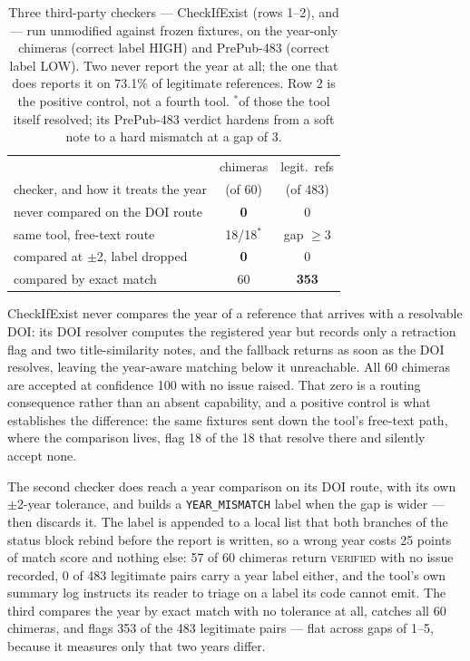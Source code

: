 \documentclass[letterpaper]{article} %
\begin{document}
\begin{table}[t]
\centering
\small
\begin{tabular}{@{}lcc@{}}
\toprule
 & chimeras & legit.\ refs \\
checker, and how it treats the year & (of 60) & (of 483) \\
\midrule
never compared on the DOI route   & \textbf{0}    & 0 \\
\quad same tool, free-text route  & 18/18$^{*}$   & gap $\geq$3 \\
compared at $\pm$2, label dropped & \textbf{0}    & 0 \\
compared by exact match           & 60            & \textbf{353} \\
\bottomrule
\end{tabular}
\caption{Three third-party checkers --- CheckIfExist
\cite{abbonato2026checkifexist} (rows 1--2),
\citet{balakrishnan2025bibverify} and \citet{sachin2026doivalidator} --- run
unmodified against frozen fixtures, on the year-only chimeras (correct label
HIGH) and PrePub-483 (correct label LOW). Two never report the year at all;
the one that does reports it on 73.1\% of legitimate references.
Row 2 is the positive control, not a fourth tool. $^{*}$of those the tool
itself resolved; its PrePub-483 verdict hardens from a soft note to a hard
mismatch at a gap of 3.}
\label{tab:checkers}
\end{table}

CheckIfExist \cite{abbonato2026checkifexist} never compares the year
of a reference that arrives with a resolvable DOI: its DOI resolver computes the
registered year but records only a retraction flag and two title-similarity
notes, and the fallback returns as soon as the DOI resolves, leaving the
year-aware matching below it unreachable. All 60 chimeras are accepted at
confidence 100 with no issue raised. That zero is a routing consequence rather
than an absent capability, and a positive control is what establishes the
difference: the same fixtures sent down the tool's free-text path, where the
comparison lives, flag 18 of the 18 that resolve there and silently accept none.

The second checker \cite{balakrishnan2025bibverify} does reach a year
comparison on its DOI route, with its own $\pm$2-year tolerance, and builds a
\texttt{YEAR\_MISMATCH} label when the gap is wider --- then discards it. The
label is appended to a local list that both branches of the status block rebind
before the report is written, so a wrong year costs 25 points of match score and
nothing else: 57 of 60 chimeras return \textsc{verified} with no issue recorded,
0 of 483 legitimate pairs carry a year label either, and the tool's own summary
log instructs its reader to triage on a label its code cannot emit. The third
\cite{sachin2026doivalidator} compares the year by exact match with no tolerance
at all, catches all 60 chimeras, and flags 353 of the 483 legitimate pairs ---
flat across gaps of 1--5, because it measures only that two years differ.
\end{document}
